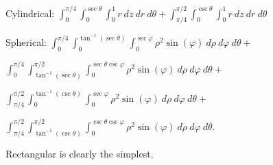 {{Cylindrical: $\int_0^{\pi/4}\int_0^{\sec\theta}\int_{0}^{1}r\ dz\ dr\ d\theta + \int_{\pi/4}^{\pi/2}\int_0^{\csc\theta}\int_{0}^{1}r\ dz\ dr\ d\theta$

Spherical: $\int _0^{\pi/4}\int _0^{\tan ^{-1}(\sec \theta)}\int _0^{\sec \varphi}\rho ^2 \sin
   (\varphi)\ d\rho\ d\varphi\ d \theta +$
	
	$\int _0^{\pi/4}\int _{\tan ^{-1}(\sec \theta)}^{\pi/2}\int _0^{\sec\theta\csc\varphi}\rho ^2 \sin
   (\varphi)\ d\rho\ d\varphi\ d \theta +$
	
	$\int _{\pi/4}^{\pi/2}\int _0^{\tan ^{-1}(\csc \theta)}\int _0^{\sec\varphi}\rho ^2 \sin
   (\varphi)\ d\rho\ d\varphi\ d \theta +$
	
	$\int _{\pi/4}^{\pi/2}\int _{\tan ^{-1}(\csc \theta)}^{\pi/2}\int _0^{\csc\theta\csc\varphi}\rho ^2 \sin
   (\varphi)\ d\rho\ d\varphi\ d \theta.$

Rectangular is clearly the simplest.}

}
